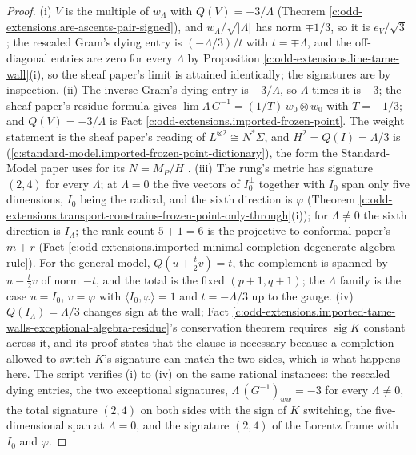 \documentclass[11pt]{article}
\theoremstyle{definition}
\theoremstyle{plain}
\providecommand{\ip}{}\renewcommand{\ip}[2]{\langle #1, #2\rangle}
\begin{document}
\begin{proof}
(i) $V$ is the multiple of $w_{\Lambda}$ with $Q(V) = -3/\Lambda$ (Theorem \ref{c:odd-extensions.are-ascents-pair-signed}), and $w_{\Lambda}/\sqrt{|\Lambda|}$ has norm $\mp 1/3$, so it is $e_{V}/\sqrt 3$; the rescaled Gram's dying entry is $(-\Lambda/3)/t$ with $t = \mp\Lambda$, and the off-diagonal entries are zero for every $\Lambda$ by Proposition \ref{c:odd-extensions.line-tame-wall}(i), so the sheaf paper's limit is attained identically; the signatures are by inspection. (ii) The inverse Gram's dying entry is $-3/\Lambda$, so $\Lambda$ times it is $-3$; the sheaf paper's residue formula gives $\lim \Lambda\, G^{-1} = (1/T)\,w_{0} \otimes w_{0}$ with $T = -1/3$; and $Q(V) = -3/\Lambda$ is Fact \ref{c:odd-extensions.imported-frozen-point}. The weight statement is the sheaf paper's reading of $L^{\otimes 2} \cong N^{*}\Sigma$, and $H^{2} = Q(I) = \Lambda/3$ is \cite[Fact~2.5]{ButlerT12} (\ref{c:standard-model.imported-frozen-point-dictionary}), the form the Standard-Model paper uses for its $N = M_{P}/H$ \cite[Obs.~7.1]{ButlerT12}. (iii) The rung's metric has signature $(2,4)$ for every $\Lambda$; at $\Lambda = 0$ the five vectors of $I_{0}^{\perp}$ together with $I_{0}$ span only five dimensions, $I_{0}$ being the radical, and the sixth direction is $\varphi$ (Theorem \ref{c:odd-extensions.transport-constrains-frozen-point-only-through}(i)); for $\Lambda \neq 0$ the sixth direction is $I_{\Lambda}$; the rank count $5 + 1 = 6$ is the projective-to-conformal paper's $m + r$ (Fact \ref{c:odd-extensions.imported-minimal-completion-degenerate-algebra-rule}). For the general model, $Q(u + \tfrac{t}{2}v) = t$, the complement is spanned by $u - \tfrac{t}{2}v$ of norm $-t$, and the total is the fixed $(p+1,q+1)$; the $\Lambda$ family is the case $u = I_{0}$, $v = \varphi$ with $\ip{I_{0}}{\varphi} = 1$ and $t = -\Lambda/3$ up to the gauge. (iv) $Q(I_{\Lambda}) = \Lambda/3$ changes sign at the wall; Fact \ref{c:odd-extensions.imported-tame-walls-exceptional-algebra-residue}'s conservation theorem requires $\operatorname{sig} K$ constant across it, and its proof states that the clause is necessary because a completion allowed to switch $K$'s signature can match the two sides, which is what happens here. The script verifies (i) to (iv) on the same rational instances: the rescaled dying entries, the two exceptional signatures, $\Lambda\,(G^{-1})_{ww} = -3$ for every $\Lambda \neq 0$, the total signature $(2,4)$ on both sides with the sign of $K$ switching, the five-dimensional span at $\Lambda = 0$, and the signature $(2,4)$ of the Lorentz frame with $I_{0}$ and $\varphi$.

\end{proof}
\end{document}
